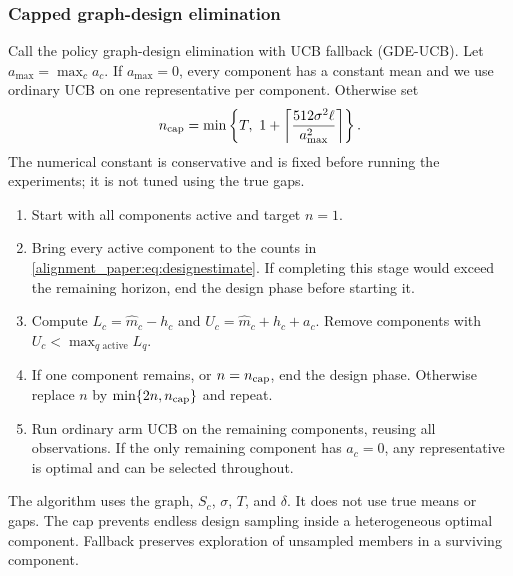 \subsubsection{Capped graph-design elimination}
Call the policy graph-design elimination with UCB fallback (GDE-UCB). Let $a_{\max}=\max_ca_c$. If $a_{\max}=0$, every component has a constant mean and we use ordinary UCB on one representative per component. Otherwise set
\begin{equation}
 n_{\rm cap}=\min\left\{T,\ 1+
          \left\lceil\frac{512\sigma^2\ell}{a_{\max}^2}\right\rceil\right\}.
 \label{alignment_paper:eq:designcap}
\end{equation}
The numerical constant is conservative and is fixed before running the experiments; it is not tuned using the true gaps.
\begin{enumerate}
 \item Start with all components active and target $n=1$.
 \item Bring every active component to the counts in \eqref{alignment_paper:eq:designestimate}. If completing this stage would exceed the remaining horizon, end the design phase before starting it.
 \item Compute $L_c=\widehat m_c-h_c$ and $U_c=\widehat m_c+h_c+a_c$. Remove components with $U_c<\max_{q\text{ active}}L_q$.
 \item If one component remains, or $n=n_{\rm cap}$, end the design phase. Otherwise replace $n$ by $\min\{2n,n_{\rm cap}\}$ and repeat.
 \item Run ordinary arm UCB on the remaining components, reusing all observations. If the only remaining component has $a_c=0$, any representative is optimal and can be selected throughout.
\end{enumerate}
The algorithm uses the graph, $S_c$, $\sigma$, $T$, and $\delta$. It does not use true means or gaps. The cap prevents endless design sampling inside a heterogeneous optimal component. Fallback preserves exploration of unsampled members in a surviving component.

